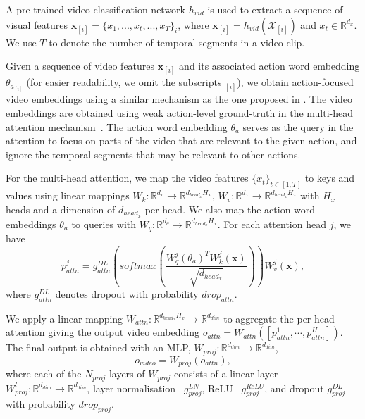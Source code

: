 \documentclass[table]{bmvc2k}
\begin{document}
A pre-trained video classification network $h_{vid}$ is used to extract a sequence of visual features $\bm{x}_{[i]} = \{x_{1}, ..., x_{t}, ..., x_{T}\}_i$, where $\bm x_{[i]}=h_{vid}(\mathcal{X}_{[i]})$ and $x_t \in \mathbb{R}^{d_{x}}$. We use $T$ to denote the number of temporal segments in a video clip.

Given a sequence of video features $\bm{x}_{[i]}$ and its associated action word embedding $\theta_{a_{[i]}}$ (for easier readability, we omit the subscripts $_{[i]}$), we obtain action-focused video embeddings using a similar mechanism as the one proposed in \cite{doughty_action_2020}. 
The video embeddings are obtained using weak action-level ground-truth in the multi-head attention mechanism~\cite{vaswani2017attention}. The action word embedding $\theta_a$ serves as the query in the attention to focus on parts of the video that are relevant to the given action, and ignore the temporal segments that may be relevant to other actions.

For the multi-head attention, we map the video features $\{x_t\}_{t \in [1,T]}$ to keys and values using linear mappings $W_k: \mathbb{R}^{d_{x}} \xrightarrow{} \mathbb{R}^{d_{head_x} H_x}$, $W_v: \mathbb{R}^{d_{x}} \xrightarrow{} \mathbb{R}^{d_{head_x} H_x}$ with $H_x$ heads and a dimension of $d_{head_x}$ per head. We also map the action word embeddings $\theta_a$ to queries with $W_q: \mathbb{R}^{d_{\theta}} \xrightarrow{} \mathbb{R}^{d_{head_x} H_x}$. 
For each attention head $j$, we have
\begin{equation}
    p^j_{attn} = g^{DL}_{attn}\left(softmax \left( \frac{W^j_q(\theta_a)^T W^j_k(\bm x)}{\sqrt{d_{head_x}}} \right)\right) W^j_v(\bm x),
\end{equation}
where $g^{DL}_{attn}$ denotes dropout with probability $drop_{attn}$.

We apply a linear mapping $W_{attn} : \mathbb{R}^{d_{head_x} H_x} \rightarrow \mathbb{R}^{d_{dim}}$ to aggregate the per-head attention giving the output video embedding $o_{attn} = W_{attn}([p^1_{attn},\cdots,p^H_{attn}])$.
The final output is obtained with an MLP, $W_{proj}: \mathbb{R}^{d_{dim}} \rightarrow \mathbb{R}^{d_{dim}}$, 
\begin{equation}
    o_{video}=W_{proj}(o_{attn}),
\end{equation}
where each of the $N_{proj}$ layers of $W_{proj}$ consists of a linear layer $W_{proj}^l: \mathbb{R}^{d_{dim}} \rightarrow \mathbb{R}^{d_{dim}} $, layer normalisation~\cite{ba2016layer} $g_{proj}^{LN}$, ReLU~\cite{nair2010rectified} $g_{proj}^{ReLU}$, and dropout $g_{proj}^{DL}$ with probability $drop_{proj}$.
\end{document}
